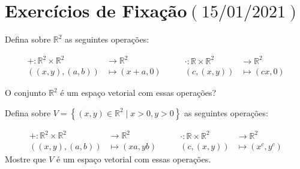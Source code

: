 \chapter{Exercícios de Fixação\quad$\left(15/01/2021\right)$}

\begin{questions}
	\question\label{exercício:2.1}

	Defina sobre $\mathbb{R}^{2}$ as seguintes operações:

	\[
		\begin{aligned}
			+\colon\mathbb{R}^{2}\times\mathbb{R}^{2}      & \longrightarrow\mathbb{R}^{2} \\
			\left(\left(x,y\right),\left(a,b\right)\right) & \longmapsto
			\left(x+a,0\right)
		\end{aligned}\qquad
		\begin{aligned}
			\cdot\colon\mathbb{R}\times\mathbb{R}^{2} & \longrightarrow\mathbb{R}^{2} \\
			\left(c,\left(x,y\right)\right)           & \longmapsto
			\left(cx,0\right)
		\end{aligned}
	\]

	O conjunto $\mathbb{R}^{2}$ é um espaço vetorial com essas operações?

	\begin{solutionordottedlines}
	\end{solutionordottedlines}

	\question\label{exercício:2.2}

	Defina sobre
	\begin{math}
		V=
		\left\{
		\left(x,y\right)\in
		\mathbb{R}^{2}\mid
		x>0,y>0
		\right\}
	\end{math}
	as seguintes operações:

	\[
		\begin{aligned}
			+\colon\mathbb{R}^{2}\times\mathbb{R}^{2}      & \longrightarrow\mathbb{R}^{2} \\
			\left(\left(x,y\right),\left(a,b\right)\right) & \longmapsto
			\left(xa,yb\right)
		\end{aligned}\qquad
		\begin{aligned}
			\cdot\colon\mathbb{R}\times\mathbb{R}^{2} & \longrightarrow\mathbb{R}^{2} \\
			\left(c,\left(x,y\right)\right)           & \longmapsto
			\left(x^{c},y^{c}\right)
		\end{aligned}
	\]
	Mostre que $V$ é um espaço vetorial com essas operações.

	\begin{solutionordottedlines}
	\end{solutionordottedlines}


\end{questions}
